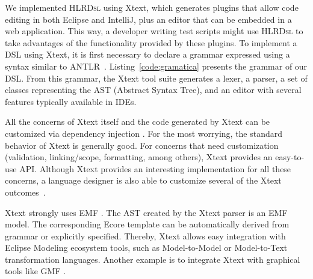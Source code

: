\documentclass[AMA,STIX1COL,hidelinks]{WileyNJD-v2}
\newcommand{\hlrdsl}{\textsc{HLRDsl}\xspace}
\begin{document}
We implemented \hlrdsl  using Xtext, which generates plugins that allow code editing in both Eclipse and IntelliJ, plus an editor that can be embedded in a web application. This way, a developer writing test scripts might use \hlrdsl to take advantages of the functionality provided by these plugins. To implement a DSL using Xtext, it is first necessary to declare a grammar expressed using a syntax similar to ANTLR~\cite{parr2013}. Listing~\ref{code:gramatica} presents the grammar of our DSL. From this grammar, the Xtext tool suite generates a lexer, a parser, a set of classes representing the AST (Abstract Syntax Tree), and an editor with several features typically available in IDEs.



All the concerns of Xtext itself and the code generated by Xtext can be customized via dependency injection \cite{prasanna2009}. For the most worrying, the standard behavior of Xtext is generally good. For concerns that need customization (validation, linking/scope, formatting, among others), Xtext provides an easy-to-use API. Although Xtext provides an interesting implementation for all these concerns, a language designer is also able to customize several of the Xtext outcomes~\cite{bettini2016}.


Xtext strongly uses EMF \cite{blewitt2013}. The AST created by the Xtext parser is an EMF model. The corresponding Ecore template can be automatically derived from grammar or explicitly specified. Thereby, Xtext allows easy integration with Eclipse Modeling ecosystem tools, such as Model-to-Model or Model-to-Text transformation languages. Another example is to integrate Xtext with graphical tools like GMF \cite{eysholdt2010}.
\end{document}
